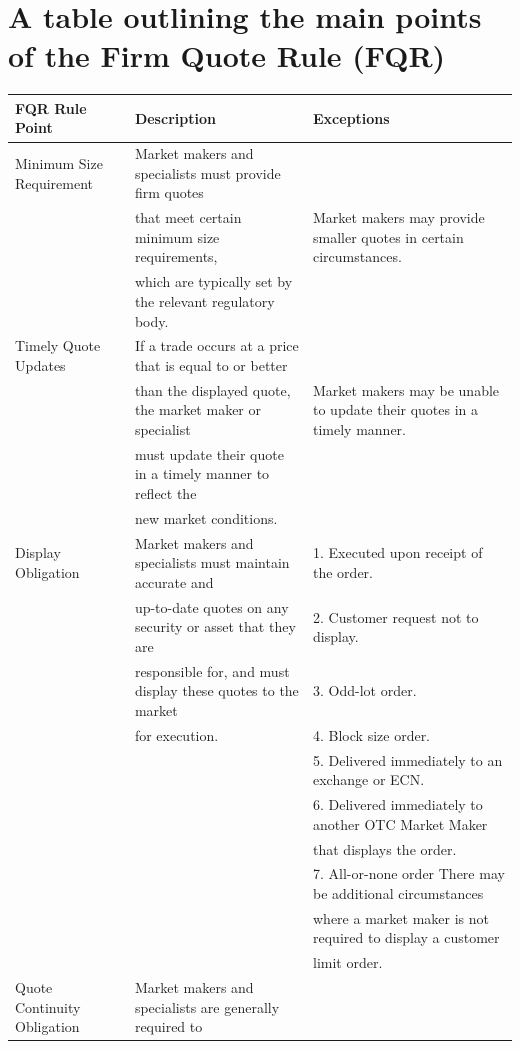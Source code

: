 \documentclass[11pt]{article}
\begin{document}
\section{A table outlining the main points of the Firm Quote Rule (FQR)}
\label{sec:org6fa5c52}

\begin{center}
\begin{tabular}{lll}
\hline
FQR Rule Point & Description & Exceptions\\[0pt]
\hline
Minimum Size Requirement & Market makers and specialists must provide firm quotes & \\[0pt]
 & that meet certain minimum size requirements, & Market makers may provide smaller quotes in certain circumstances.\\[0pt]
 & which are typically set by the relevant regulatory body. & \\[0pt]
\hline
Timely Quote Updates & If a trade occurs at a price that is equal to or better & \\[0pt]
 & than the displayed quote, the market maker or specialist & Market makers may be unable to update their quotes in a timely manner.\\[0pt]
 & must update their quote in a timely manner to reflect the & \\[0pt]
 & new market conditions. & \\[0pt]
\hline
Display Obligation & Market makers and specialists must maintain accurate and & 1. Executed upon receipt of the order.\\[0pt]
 & up-to-date quotes on any security or asset that they are & 2. Customer request not to display.\\[0pt]
 & responsible for, and must display these quotes to the market & 3. Odd-lot order.\\[0pt]
 & for execution. & 4. Block size order.\\[0pt]
 &  & 5. Delivered immediately to an exchange or ECN.\\[0pt]
 &  & 6. Delivered immediately to another OTC Market Maker\\[0pt]
 &  & that displays the order.\\[0pt]
 &  & 7. All-or-none order There may be additional circumstances\\[0pt]
 &  & where a market maker is not required to display a customer\\[0pt]
 &  & limit order.\\[0pt]
\hline
Quote Continuity Obligation & Market makers and specialists are generally required to & \\[0pt]

\end{tabular}
\end{center}
\end{document}
